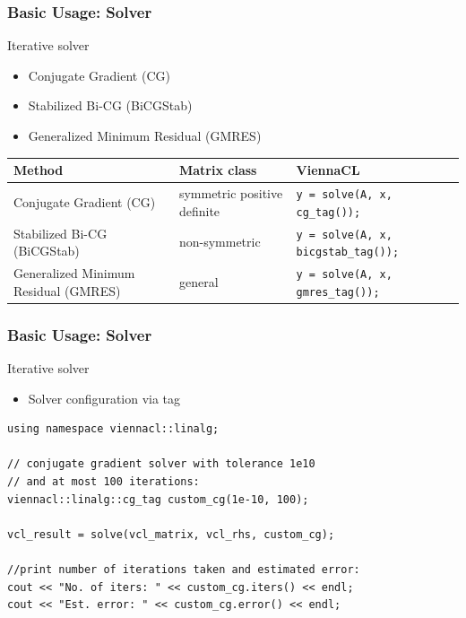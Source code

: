 \begin{frame}
\frametitle{Basic Usage: Solver}

\begin{block}{Iterative solver}
  \begin{itemize}
   \item Conjugate Gradient (CG)
   \item Stabilized Bi-CG (BiCGStab)
   \item Generalized Minimum Residual (GMRES)
  \end{itemize}
\end{block}

\begin{table}[tb]
\begin{center}
\scriptsize
\renewcommand{\arraystretch}{1.2}
\begin{tabular}{p{2.5cm}|p{1.5cm}|p{5cm}}
Method & Matrix class & ViennaCL\\
\hline
\hline
Conjugate Gradient (CG) & symmetric positive definite & \texttt{y = solve(A, x, cg\_tag());} \\
\hline
Stabilized Bi-CG (BiCGStab) & non-symmetric & \texttt{y = solve(A, x, bicgstab\_tag());} \\
\hline
Generalized Minimum Residual (GMRES) & general & \texttt{y = solve(A, x, gmres\_tag());} \\
\hline
\hline
\end{tabular}
\end{center}
\end{table}

\end{frame}



\begin{frame}[fragile]
\frametitle{Basic Usage: Solver}

\begin{block}{Iterative solver}
  \begin{itemize}
   \item Solver configuration via tag
  \end{itemize}
  
  \begin{lstlisting}
using namespace viennacl::linalg;

// conjugate gradient solver with tolerance 1e10
// and at most 100 iterations:
viennacl::linalg::cg_tag custom_cg(1e-10, 100);

vcl_result = solve(vcl_matrix, vcl_rhs, custom_cg);

//print number of iterations taken and estimated error:
cout << "No. of iters: " << custom_cg.iters() << endl;
cout << "Est. error: " << custom_cg.error() << endl;
  \end{lstlisting}
\end{block}

\end{frame}



